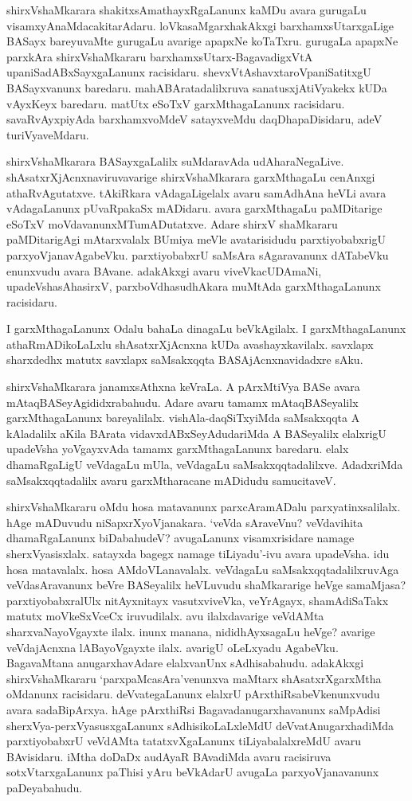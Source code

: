 shirxVshaMkarara shakitxsAmathayxRgaLanunx kaMDu avara gurugaLu visamxyAnaMdacakitarAdaru. loVkasaMgarxhakAkxgi barxhamxsUtarxgaLige BASayx bareyuvaMte gurugaLu avarige apapxNe koTaTxru. gurugaLa apapxNe parxkAra shirxVshaMkararu barxhamxsUtarx-BagavadigxVtA upaniSadABxSayxgaLanunx racisidaru. shevxVtAshavxtaroVpaniSatitxgU BASayxvanunx baredaru. mahABAratadalilxruva sanatusxjAtiVyakekx kUDa vAyxKeyx baredaru. matUtx eSoTxV garxMthagaLanunx racisidaru. savaRvAyxpiyAda barxhamxvoMdeV satayxveMdu daqDhapaDisidaru, adeV turiVyaveMdaru.

shirxVshaMkarara BASayxgaLalilx suMdaravAda udAharaNegaLive. shAsatxrXjAcnxnaviruvavarige shirxVshaMkarara garxMthagaLu cenAnxgi athaRvAgutatxve. tAkiRkara vAdagaLigelalx avaru samAdhAna heVLi avara vAdagaLanunx pUvaRpakaSx mADidaru. avara garxMthagaLu paMDitarige eSoTxV moVdavanunxMTumADutatxve. Adare shirxV shaMkararu paMDitarigAgi mAtarxvalalx BUmiya meVle avatarisidudu parxtiyobabxrigU parxyoVjanavAgabeVku. parxtiyobabxrU saMsAra sAgaravanunx dATabeVku enunxvudu avara BAvane. adakAkxgi avaru viveVkacUDAmaNi, upadeVshasAhasirxV, parxboVdhasudhAkara muMtAda garxMthagaLanunx racisidaru.

I garxMthagaLanunx Odalu bahaLa dinagaLu beVkAgilalx. I garxMthagaLanunx athaRmADikoLaLxlu shAsatxrXjAcnxna kUDa avashayxkavilalx. savxlapx sharxdedhx matutx savxlapx saMsakxqqta BASAjAcnxnavidadxre sAku.

shirxVshaMkarara janamxsAthxna keVraLa. A pArxMtiVya BASe avara mAtaqBASeyAgididxrabahudu. Adare avaru tamamx mAtaqBASeyalilx garxMthagaLanunx bareyalilalx. vishAla-daqSiTxyiMda saMsakxqqta A kAladalilx aKila BArata vidavxdABxSeyAdudariMda A BASeyalilx elalxrigU upadeVsha yoVgayxvAda tamamx garxMthagaLanunx baredaru. elalx dhamaRgaLigU veVdagaLu mUla, veVdagaLu saMsakxqqtadalilxve. AdadxriMda saMsakxqqtadalilx avaru garxMtharacane mADidudu samucitaveV.

shirxVshaMkararu oMdu hosa matavanunx parxcAramADalu parxyatinxsalilalx. hAge mADuvudu niSapxrXyoVjanakara. `veVda sAraveVnu? veVdavihita dhamaRgaLanunx biDabahudeV? avugaLanunx visamxrisidare namage sherxVyasisxlalx. satayxda bagegx namage tiLiyadu'-ivu avara upadeVsha. idu hosa matavalalx. hosa AMdoVLanavalalx. veVdagaLu saMsakxqqtadalilxruvAga veVdasAravanunx beVre BASeyalilx heVLuvudu shaMkararige heVge samaMjasa? parxtiyobabxralUlx nitAyxnitayx vasutxviveVka, veYrAgayx, shamAdiSaTakx matutx moVkeSxVceCx iruvudilalx. avu ilalxdavarige veVdAMta sharxvaNayoVgayxte ilalx. inunx manana, nididhAyxsagaLu heVge? avarige veVdajAcnxna lABayoVgayxte ilalx. avarigU oLeLxyadu AgabeVku. BagavaMtana anugarxhavAdare elalxvanUnx sAdhisabahudu. adakAkxgi shirxVshaMkararu `parxpaMcasAra'venunxva maMtarx shAsatxrXgarxMtha oMdanunx racisidaru. deVvategaLanunx elalxrU pArxthiRsabeVkenunxvudu avara sadaBipArxya. hAge pArxthiRsi Bagavadanugarxhavanunx saMpAdisi sherxVya-perxVyasusxgaLanunx sAdhisikoLaLxleMdU deVvatAnugarxhadiMda parxtiyobabxrU veVdAMta tatatxvXgaLanunx tiLiyabalalxreMdU avaru BAvisidaru. iMtha doDaDx audAyaR BAvadiMda avaru racisiruva sotxVtarxgaLanunx paThisi yAru beVkAdarU avugaLa parxyoVjanavanunx paDeyabahudu.

